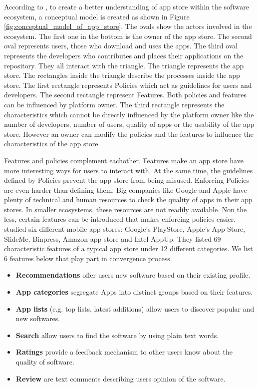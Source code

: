 According to \cite{Jansen}, to create a better understanding of app store within the software ecosystem, a conceptual model is created as shown in Figure \ref{fig:conceptual_model_of_app_store}. The ovals show the actors involved in the ecosystem. The first one in the bottom is the owner of the app store. The second oval represents users, those who download and uses the apps. The third oval represents the developers who contributes and places their applications on the repository. They all interact with the triangle. The triangle represents the app store. The rectangles inside the triangle describe the processes inside the app store. The first rectangle represents Policies which act as guidelines for users and developers. The second rectangle represent Features. Both policies and features can be influenced by platform owner. The third rectangle represents the characteristics which cannot be directly influenced by the platform owner like the number of developers, number of users, quality of apps or the usability of the app store. However an owner can modify the policies and the features to influence the characteristics of the app store.

Features and policies complement eachother. Features make an app store have more interesting ways for users to interact with. At the same time, the guidelines defined by Policies prevent the app store from being misused. Enforcing Policies are even harder than defining them. Big companies like Google and Apple have plenty of technical and human resources to check the quality of apps in their app stores. In smaller ecosystems, these resources are not readily available. Non the less, certain features can be introduced that makes enforcing policies easier. \cite{Jansen} studied six different mobile app stores: Google's PlayStore, Apple's App Store, SlideMe, Binpress, Amazon app store and Intel AppUp. They listed 69 characteristic features of a typical app store under 12 different categories. We list 6 features below that play part in convergence process.

\begin{itemize}
  \item \textbf{Recommendations} offer users new software based on their existing profile.
  \item \textbf{App categories} segregate Apps into distinct groups based on their features.
  \item \textbf{App lists} (e.g. top lists, latest additions) allow users to discover popular and new softwares.
  \item \textbf{Search} allow users to find the software by using plain text words.
  \item \textbf{Ratings} provide a feedback mechanism to other users know about the quality of software.
  \item \textbf{Review} are text comments describing users opinion of the software.
\end{itemize}

